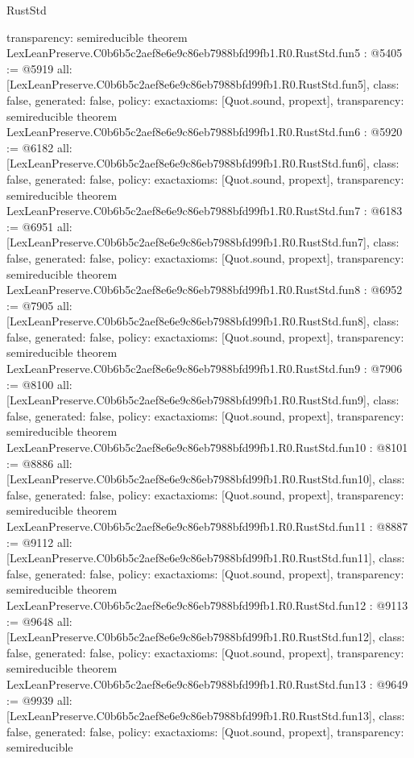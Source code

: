 \begin{lexlean}{RustStd}
\begin{coremodule}
{  transparency: semireducible
}
theorem LexLeanPreserve.C0b6b5c2aef8e6e9c86eb7988bfd99fb1.R0.RustStd.fun5 : @5405 := @5919 {
  all: [LexLeanPreserve.C0b6b5c2aef8e6e9c86eb7988bfd99fb1.R0.RustStd.fun5],
  class: false,
  generated: false,
  policy: exact{axioms: [Quot.sound, propext]},
  transparency: semireducible
}
theorem LexLeanPreserve.C0b6b5c2aef8e6e9c86eb7988bfd99fb1.R0.RustStd.fun6 : @5920 := @6182 {
  all: [LexLeanPreserve.C0b6b5c2aef8e6e9c86eb7988bfd99fb1.R0.RustStd.fun6],
  class: false,
  generated: false,
  policy: exact{axioms: [Quot.sound, propext]},
  transparency: semireducible
}
theorem LexLeanPreserve.C0b6b5c2aef8e6e9c86eb7988bfd99fb1.R0.RustStd.fun7 : @6183 := @6951 {
  all: [LexLeanPreserve.C0b6b5c2aef8e6e9c86eb7988bfd99fb1.R0.RustStd.fun7],
  class: false,
  generated: false,
  policy: exact{axioms: [Quot.sound, propext]},
  transparency: semireducible
}
theorem LexLeanPreserve.C0b6b5c2aef8e6e9c86eb7988bfd99fb1.R0.RustStd.fun8 : @6952 := @7905 {
  all: [LexLeanPreserve.C0b6b5c2aef8e6e9c86eb7988bfd99fb1.R0.RustStd.fun8],
  class: false,
  generated: false,
  policy: exact{axioms: [Quot.sound, propext]},
  transparency: semireducible
}
theorem LexLeanPreserve.C0b6b5c2aef8e6e9c86eb7988bfd99fb1.R0.RustStd.fun9 : @7906 := @8100 {
  all: [LexLeanPreserve.C0b6b5c2aef8e6e9c86eb7988bfd99fb1.R0.RustStd.fun9],
  class: false,
  generated: false,
  policy: exact{axioms: [Quot.sound, propext]},
  transparency: semireducible
}
theorem LexLeanPreserve.C0b6b5c2aef8e6e9c86eb7988bfd99fb1.R0.RustStd.fun10 : @8101 := @8886 {
  all: [LexLeanPreserve.C0b6b5c2aef8e6e9c86eb7988bfd99fb1.R0.RustStd.fun10],
  class: false,
  generated: false,
  policy: exact{axioms: [Quot.sound, propext]},
  transparency: semireducible
}
theorem LexLeanPreserve.C0b6b5c2aef8e6e9c86eb7988bfd99fb1.R0.RustStd.fun11 : @8887 := @9112 {
  all: [LexLeanPreserve.C0b6b5c2aef8e6e9c86eb7988bfd99fb1.R0.RustStd.fun11],
  class: false,
  generated: false,
  policy: exact{axioms: [Quot.sound, propext]},
  transparency: semireducible
}
theorem LexLeanPreserve.C0b6b5c2aef8e6e9c86eb7988bfd99fb1.R0.RustStd.fun12 : @9113 := @9648 {
  all: [LexLeanPreserve.C0b6b5c2aef8e6e9c86eb7988bfd99fb1.R0.RustStd.fun12],
  class: false,
  generated: false,
  policy: exact{axioms: [Quot.sound, propext]},
  transparency: semireducible
}
theorem LexLeanPreserve.C0b6b5c2aef8e6e9c86eb7988bfd99fb1.R0.RustStd.fun13 : @9649 := @9939 {
  all: [LexLeanPreserve.C0b6b5c2aef8e6e9c86eb7988bfd99fb1.R0.RustStd.fun13],
  class: false,
  generated: false,
  policy: exact{axioms: [Quot.sound, propext]},
  transparency: semireducible
}
\end{coremodule}
\end{lexlean}
